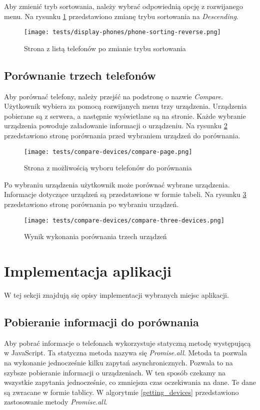 Aby zmienić tryb sortowania, należy wybrać odpowiednią opcję z rozwijanego menu. Na rysunku \ref{reverse_sorting} przedstawiono zmianę trybu sortowania na \textit{Descending}.
\begin{figure}[H]
  \centering
  \texttt{[image: tests/display-phones/phone-sorting-reverse.png]}
  \caption{Strona z listą telefonów po zmianie trybu sortowania}
  \label{reverse_sorting}
\end{figure}

\subsection{Porównanie trzech telefonów}
Aby porównać telefony, należy przejść na podstronę o nazwie \textit{Compare}. Użytkownik wybiera za pomocą rozwijanych menu trzy urządzenia. Urządzenia pobierane są z serwera, a następnie wyświetlane są na stronie. Każde wybranie urządzenia powoduje załadowanie informacji o urządzeniu. Na rysunku \ref{compare_page} przedstawiono stronę porównania przed wybraniem urządzeń do porównania.
\begin{figure}[H]
  \centering
  \texttt{[image: tests/compare-devices/compare-page.png]}
  \caption{Strona z możliwością wyboru telefonów do porównania}
  \label{compare_page}
\end{figure}

Po wybraniu urządzenia użytkownik może porównać wybrane urządzenia. Informacje dotyczące urządzeń są przedstawione w formie tabeli. Na rysunku \ref{compare_three_devices} przedstawiono stronę porównania po wybraniu urządzeń.

\begin{figure}[H]
  \centering
  \texttt{[image: tests/compare-devices/compare-three-devices.png]}
  \caption{Wynik wykonania porównania trzech urządzeń}
  \label{compare_three_devices}
\end{figure}

\section[Implementacja \texorpdfstring{\\ aplikacji}{}]{Implementacja aplikacji}
W tej sekcji znajdują się opisy implementacji wybranych miejsc aplikacji.

\subsection{Pobieranie informacji do porównania}
Aby pobrać informacje o telefonach wykorzystuje statyczną metodę występującą w JavaScript. Ta statyczna metoda nazywa się \textit{Promise.all}. Metoda ta pozwala na wykonanie jednocześnie kilku zapytań asynchronicznych. Pozwala to na szybsze pobieranie informacji o urządzeniach. W ten sposób czekamy na wszystkie zapytania jednocześnie, co zmniejsza czas oczekiwania na dane. Te dane są zwracane w formie tablicy. W algorytmie \ref{getting_devices} przedstawiono zastosowanie metody \textit{Promise.all}.

